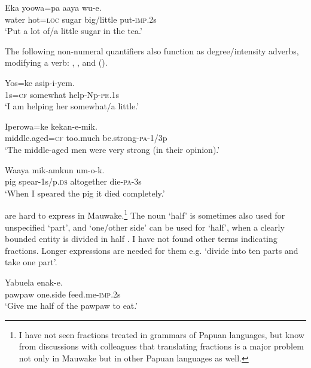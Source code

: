 \ea%
\label{ex:3:x103}
\gll Eka yoowa=pa aaya  wu-e. \\
water hot=\textsc{loc} sugar big/little put-\textsc{imp}.2s\\
\glt`Put a lot of/a little sugar in the tea.'
\z

The following non-numeral quantifiers also function as degree/intensity adverbs, modifying a verb: , ,  and  ().

\ea
\gll Yos=ke  asip-i-yem.\\
1s=\textsc{cf} somewhat help-Np-\textsc{pr}.1s\\
\glt`I am helping her somewhat/a little.'
\z

\ea%
\label{ex:3:x512}
\gll Iperowa=ke  kekan-e-mik. \\
middle.aged=\textsc{cf} too.much be.strong-\textsc{pa}-1/3p\\
\glt`The middle-aged men were very strong (in their opinion).'
\z

\ea%
\label{ex:3:x513}
\gll Waaya mik-amkun  um-o-k. \\
pig spear-1s/p.\textsc{ds} altogether die-\textsc{pa}-3s\\
\glt`When I speared the pig it died completely.'
\z

 are hard to express in Mauwake.\footnote{I have not seen fractions treated in grammars of Papuan languages, but know from discussions with colleagues that translating fractions is a major problem not only in Mauwake but in other Papuan languages as well.} The noun  `half' is sometimes also used for unspecified `part', and  `one/other side' can be used for `half', when a clearly bounded entity is divided in half . I have not found other terms indicating fractions. Longer expressions are needed for them e.g. `divide into ten parts and take one part'.

\ea%
\label{ex:3:x104}
\gll Yabuela  enak-e. \\
pawpaw one.side feed.me-\textsc{imp}.2s\\
\glt`Give me half of the pawpaw to eat.'
\z

